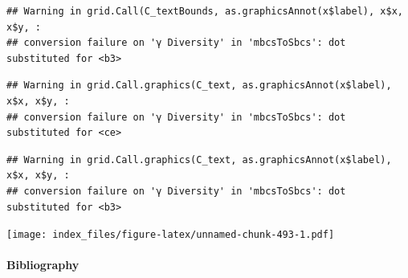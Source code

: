 \documentclass[
]{article}
\begin{document}
\begin{verbatim}
## Warning in grid.Call(C_textBounds, as.graphicsAnnot(x$label), x$x, x$y, :
## conversion failure on 'γ Diversity' in 'mbcsToSbcs': dot substituted for <b3>
\end{verbatim}

\begin{verbatim}
## Warning in grid.Call.graphics(C_text, as.graphicsAnnot(x$label), x$x, x$y, :
## conversion failure on 'γ Diversity' in 'mbcsToSbcs': dot substituted for <ce>
\end{verbatim}

\begin{verbatim}
## Warning in grid.Call.graphics(C_text, as.graphicsAnnot(x$label), x$x, x$y, :
## conversion failure on 'γ Diversity' in 'mbcsToSbcs': dot substituted for <b3>
\end{verbatim}

\texttt{[image: index\_files/figure-latex/unnamed-chunk-493-1.pdf]}

\hypertarget{bibliography}{%
\paragraph*{Bibliography}\label{bibliography}}
\end{document}
